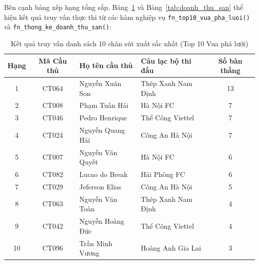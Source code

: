 Bên cạnh bảng xếp hạng tổng sắp, Bảng~\ref{tab:top10_vua_pha_luoi} và Bảng~\ref{tab:doanh_thu_san} thể hiện kết quả truy vấn thực thi từ các hàm nghiệp vụ \texttt{fn\_top10\_vua\_pha\_luoi()} và \texttt{fn\_thong\_ke\_doanh\_thu\_san()}:

\begin{table}[H]
\centering
\small
\begin{tabular}{|c|c|l|l|c|}
\hline
\textbf{Hạng} & \textbf{Mã Cầu thủ} & \textbf{Họ tên cầu thủ} & \textbf{Câu lạc bộ thi đấu} & \textbf{Số bàn thắng} \\ \hline
1 & CT064 & Nguyễn Xuân Son & Thép Xanh Nam Định & 13 \\ \hline
2 & CT008 & Phạm Tuấn Hải & Hà Nội FC & 7 \\ \hline
3 & CT046 & Pedro Henrique & Thể Công Viettel & 7 \\ \hline
4 & CT024 & Nguyễn Quang Hải & Công An Hà Nội & 7 \\ \hline
5 & CT007 & Nguyễn Văn Quyết & Hà Nội FC & 6 \\ \hline
6 & CT082 & Lucao do Break & Hải Phòng FC & 6 \\ \hline
7 & CT029 & Jeferson Elias & Công An Hà Nội & 5 \\ \hline
8 & CT063 & Nguyễn Văn Toàn & Thép Xanh Nam Định & 4 \\ \hline
9 & CT042 & Nguyễn Hoàng Đức & Thể Công Viettel & 4 \\ \hline
10 & CT096 & Trần Minh Vương & Hoàng Anh Gia Lai & 3 \\ \hline
\end{tabular}
\caption{Kết quả truy vấn danh sách 10 chân sút xuất sắc nhất (Top 10 Vua phá lưới)}
\label{tab:top10_vua_pha_luoi}
\end{table}

\begin{table}[H]
\centering
\small
{}
\caption{Kết quả thống kê số lượng khán giả và doanh thu bán vé các sân vận động}
\label{tab:doanh_thu_san}
\end{table}
